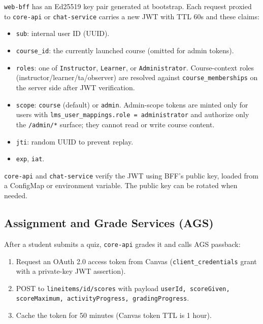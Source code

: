 \texttt{web-bff} has an Ed25519 key pair generated at bootstrap. Each
request proxied to \texttt{core-api} or \texttt{chat-service} carries a
new JWT with TTL 60s and these claims:

\begin{itemize}
    \item \texttt{sub}: internal user ID (UUID).
    \item \texttt{course\_id}: the currently launched course (omitted for
          admin tokens).
    \item \texttt{roles}: one of \texttt{Instructor},
          \texttt{Learner}, or \texttt{Administrator}. Course-context
          roles (instructor/learner/ta/observer) are resolved against
          \texttt{course\_memberships} on the server side after JWT
          verification.
    \item \texttt{scope}: \texttt{course} (default) or \texttt{admin}.
          Admin-scope tokens are minted only for users with
          \texttt{lms\_user\_mappings.role = administrator} and authorize
          only the \texttt{/admin/*} surface; they cannot read or write
          course content.
    \item \texttt{jti}: random UUID to prevent replay.
    \item \texttt{exp}, \texttt{iat}.
\end{itemize}

\texttt{core-api} and \texttt{chat-service} verify the JWT using BFF's
public key, loaded from a ConfigMap or environment variable. The public
key can be rotated when needed.

\subsection{Assignment and Grade Services (AGS)}

After a student submits a quiz, \texttt{core-api} grades it and calls
AGS passback:

\begin{enumerate}
    \item Request an OAuth 2.0 access token from Canvas
          (\texttt{client\_credentials} grant with a private-key JWT
          assertion).
    \item POST to \texttt{lineitems/{id}/scores} with payload
          \texttt{{userId, scoreGiven, scoreMaximum, activityProgress,
          gradingProgress}}.
    \item Cache the token for 50 minutes (Canvas token TTL is 1 hour).
\end{enumerate}

